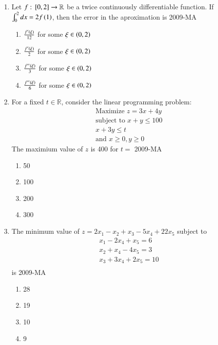 \documentclass[journal,12pt,onecolumn]{IEEEtran}
\theoremstyle{remark}
\begin{document}
\begin{enumerate}
	\item Let $f: {}\left[0,2\right]\to \mathbb{R}$ be a twice continuously differentiable function. If $\int_{0}^{2} dx=2f\left(1\right)$, then the error in the aproximation is
\hfill{2009-MA}
	\begin{multicols}{2}
	\begin{enumerate}
		\item $\frac{f'\left(\xi\right)}{12}$ for some $\xi \in \left(0,2\right)$
		\item $\frac{f'\left(\xi\right)}{2}$ for some $\xi \in \left(0,2\right)$
 		\item $\frac{f''\left(\xi\right)}{3}$ for some $\xi \in \left(0,2\right)$
		\item $\frac{f''\left(\xi\right)}{6}$ for some $\xi \in \left(0,2\right)$
	\end{enumerate}
	\end{multicols}

	\item For a fixed $t \in \mathbb{R}$, consider the linear programming problem:
\begin{align*}
\text{Maximize } z=3x+4y \\
\text{subject to } x+y \leq 100 \\
x+3y \leq t \\
\text{and } x \geq 0, y\geq 0
\end{align*}
The maximium value of $z$ is 400 for $t=$ 
\hfill{2009-MA}
	\begin{multicols}{4}
	\begin{enumerate}
		\item 50
		\item 100
		\item 200
		\item 300
	\end{enumerate}
	\end{multicols}

\item The minimum value of $z=2x_{1}-x_{2}+x_{3}-5x_{4}+22x_{5}$ subject to
\begin{align*}
	x_{1}-2x_{4}+x_{5}=6\\
	x_{2}+x_{4}-4x_{5}=3\\
	x_{3}+3x_{4}+2x_{5}=10\\
\end{align*}
is
\hfill{2009-MA}
	\begin{multicols}{4}
	\begin{enumerate}
		\item 28
		\item 19
		\item 10
		\item 9
	\end{enumerate}
	\end{multicols}
	

\end{enumerate}
\end{document}
